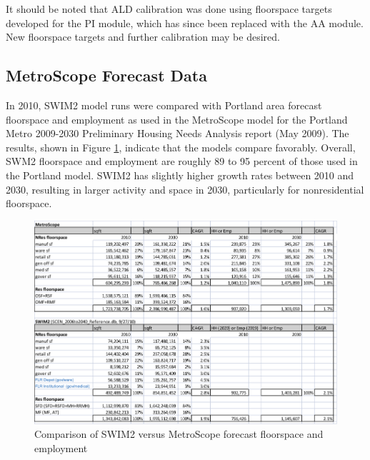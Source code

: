 It should be noted that ALD calibration was done using floorspace targets developed for the PI module, which has since been replaced with the AA module. New floorspace targets and further calibration may be desired.


 
\subsection{MetroScope Forecast Data}\label{sec:metroscope-forecast}
In 2010, SWIM2 model runs were compared with Portland area forecast floorspace and employment as used in the MetroScope model for the Portland Metro 2009-2030 Preliminary Housing Needs Analysis report (May 2009). The results, shown in Figure \ref{fig:metroscope-comparison}, indicate that the models compare favorably. Overall, SWM2 floorspace and employment are roughly 89 to 95 percent of those used in the Portland model. SWIM2 has slightly higher growth rates between 2010 and 2030, resulting in larger activity and space in 2030, particularly for nonresidential floorspace. 

\begin{figure}[!t]     %
\centering
\includegraphics[width=6.5in]{ald/metroscope-comparison}
\caption{Comparison of SWIM2 versus MetroScope forecast floorspace and employment}
\label{fig:metroscope-comparison}
\end{figure}

